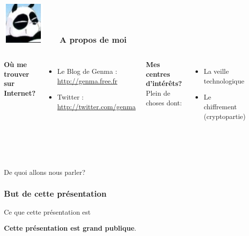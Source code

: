 \documentclass{beamer}
\begin{document}
\begin{frame}
\frametitle{\includegraphics[scale=0.4]{./images/Genma.jpg} \ \ \  A propos de moi  }
\begin{columns}[c] 

\textbf{Où me trouver sur Internet?}
\begin{itemize}
\item Le Blog de Genma : \url{http://genma.free.fr}
\item Twitter : \url{http://twitter.com/genma}
\end{itemize}

\textbf{Mes centres d'intérêts?}
\\ Plein de choses dont:
\begin{itemize}
\item La veille technologique
\item Le chiffrement (cryptopartie)
\end{itemize}

\includegraphics[width=5cm,height=5cm]{./images/blog.png} 
\end{columns}
\end{frame}


\begin{frame}
\begin{center}
\Huge{De quoi allons nous parler?}
\end{center}
\end{frame}


\begin{frame}
\frametitle{But de cette présentation}

\begin{block}{Ce que cette présentation est}
\begin{itemize}
\end{itemize}
 \textbf{Cette présentation est grand publique}.
\end{block}
\end{frame}
\end{document}
